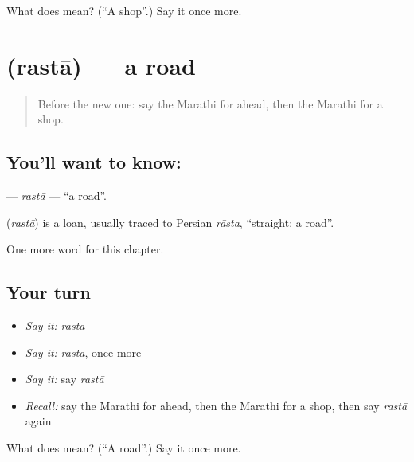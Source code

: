 \begin{tcolorbox}[breakable,colback=teal!4,colframe=teal!35!black,title={Before you move on}]
What does  mean? (\textquotedblleft{}A shop\textquotedblright{}.) Say it once more.
\end{tcolorbox}
\section[\texorpdfstring{\mr{रस्ता} (rastā)}{रस्ता (rastā)}]{ (rastā) — a road}

\label{lesson:MR-C113-rasta}



\begin{quote}
Before the new one: say the Marathi for ahead, then the Marathi for a shop.
\end{quote}

\subsection*{You'll want to know: }
\textbf{} — \emph{rastā} — \textquotedblleft{}a road\textquotedblright{}.

\begin{cousinweb}
\textbf{} (\emph{rastā}) is a loan, usually traced to Persian \emph{rāsta}, \textquotedblleft{}straight; a road\textquotedblright{}.
\end{cousinweb}

\begin{grammarlens}[title={What you've built}]
One more word for this chapter.
\end{grammarlens}

\subsection*{Your turn}
\begin{itemize}
\raggedright
  \item \emph{Say it:} \emph{rastā}
  \item \emph{Say it:} \emph{rastā}, once more
  \item \emph{Say it:} say \emph{rastā}
  \item \emph{Recall:} say the Marathi for ahead, then the Marathi for a shop, then say \emph{rastā} again
\end{itemize}

\begin{tcolorbox}[breakable,colback=teal!4,colframe=teal!35!black,title={Before you move on}]
What does  mean? (\textquotedblleft{}A road\textquotedblright{}.) Say it once more.
\end{tcolorbox}
